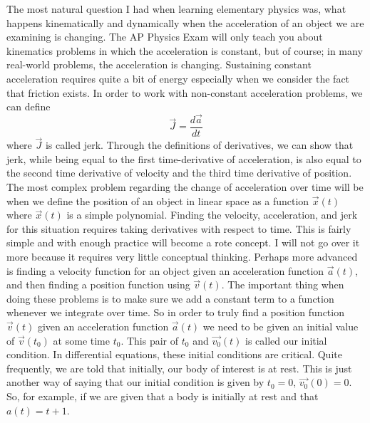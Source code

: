 \newline
The most natural question I had when learning elementary physics was, what happens kinematically and dynamically when the acceleration of an object we are examining is changing. The AP Physics Exam will only teach you about kinematics problems in which the acceleration is constant, but of course; in many real-world problems, the acceleration is changing. Sustaining constant acceleration requires quite a bit of energy especially when we consider the fact that friction exists. In order to work with non-constant acceleration problems, we can define \begin{equation}\vec{J}= \frac{d\vec{a}}{dt}\end{equation} where $\vec{J}$ is called jerk. Through the definitions of derivatives, we can show that jerk, while being equal to the first time-derivative of acceleration, is also equal to the second time derivative of velocity and the third time derivative of position. The most complex problem regarding the change of acceleration over time will be when we define the position of an object in linear space as a function $\vec{x}\left(t\right)$ where $\vec{x}\left(t\right)$ is a simple polynomial. Finding the velocity, acceleration, and jerk for this situation requires taking derivatives with respect to time. This is fairly simple and with enough practice will become a rote concept. I will not go over it more because it requires very little conceptual thinking. Perhaps more advanced is finding a velocity function for an object given an acceleration function $\vec{a}\left(t\right)$, and then finding a position  function using $\vec{v}\left(t\right)$. The important thing when doing these problems is to make sure we add a constant term to a function whenever we integrate over time. So in order to truly find a position function $\vec{v}\left(t\right)$ given an acceleration function $\vec{a}\left(t\right)$ we need to be given an initial value of $\vec{v}\left(t_0\right)$ at some  time $t_0$. This pair of $t_0$ and $\vec{v_0} \left(t\right)$ is called our initial condition. In differential equations, these initial conditions are critical. Quite frequently, we are told that initially, our body of interest is at rest. This is just another way of saying that our initial condition is given by $t_0=0$, $\vec{v_0}\left(0\right)=0$. So, for example, if we are given that a body is initially at rest and that $a\left(t\right)=t+1$. 

